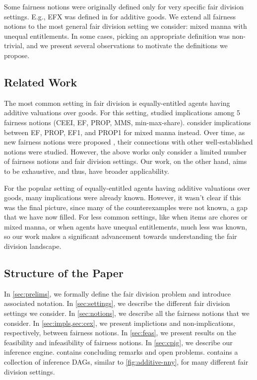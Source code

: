 Some fairness notions were originally defined only for very specific fair division settings.
E.g., EFX was defined in \cite{caragiannis2019unreasonable} for additive goods.
We extend all fairness notions to the most general fair division setting we consider:
mixed manna with unequal entitlements.
In some cases, picking an appropriate definition was non-trivial,
and we present several observations to motivate the definitions we propose.

\subsection{Related Work}

The most common setting in fair division is equally-entitled agents
having additive valuations over goods. For this setting, \cite{bouveret2016characterizing}
studied implications among 5 fairness notions (CEEI, EF, PROP, MMS, min-max-share).
\cite{aziz2021fair} consider implications between EF, PROP, EF1, and PROP1 for mixed manna instead.
Over time, as new fairness notions were proposed
\cite{caragiannis2023new,babaioff2023fair,barman2018groupwise,aziz2018knowledge},
their connections with other well-established notions were studied.
However, the above works only consider a limited number of fairness notions and fair division settings.
Our work, on the other hand, aims to be exhaustive, and thus, have broader applicability.

For the popular setting of equally-entitled agents having additive valuations over goods,
many implications were already known. However, it wasn't clear if this was the final picture,
since many of the counterexamples were not known, a gap that we have now filled.
For less common settings, like when items are chores or mixed manna,
or when agents have unequal entitlements, much less was known,
so our work makes a significant advancement towards understanding the fair division landscape.

\subsection{Structure of the Paper}

In \cref{sec:prelims}, we formally define the fair division problem and introduce associated notation.
In \cref{sec:settings}, we describe the different fair division settings we consider.
In \cref{sec:notions}, we describe all the fairness notions that we consider.
In \cref{sec:impls,sec:cex}, we present implictions and non-implications, respectively, between fairness notions.
In \cref{sec:feas}, we present results on the feasibility and infeasibility of fairness notions.
In \cref{sec:cpig}, we describe our inference engine.
 contains concluding remarks and open problems.
 contains a collection of inference DAGs, similar to \cref{fig:additive-nny},
for many different fair division settings.

